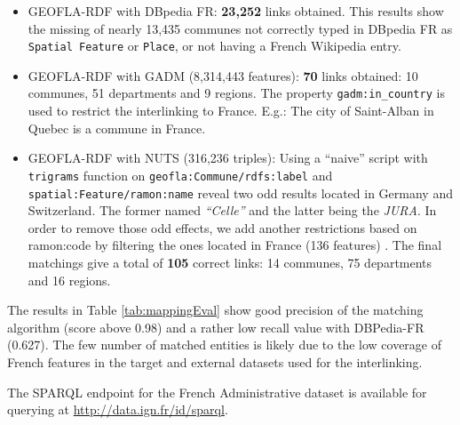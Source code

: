 \begin{itemize}
 \item GEOFLA-RDF with DBpedia FR: \textbf{23,252} links obtained. This results show the missing of nearly 13,435 communes not correctly typed in DBpedia FR as \texttt{Spatial Feature} or \texttt{Place}, or not having a French Wikipedia entry.
 \item GEOFLA-RDF with GADM (8,314,443 features): \textbf{70} links obtained: 10 communes, 51 departments and 9 regions. The property \texttt{gadm:in\_country} is used to restrict the interlinking to France. E.g.: The city of Saint-Alban in Quebec is a commune in France.
 \item GEOFLA-RDF with NUTS (316,236 triples): Using a ``naive'' script with \texttt{trigrams} function on \texttt{geofla:Commune/rdfs:label} and \texttt{spatial:Feature/ramon:name} reveal two odd results located in Germany and Switzerland. The former named \textit{``Celle''} and the latter being the \textit{JURA}. In order to remove those odd effects, we add another restrictions based on \textsf{ramon:code} by filtering the ones located in France (136 features) . The final matchings give a total of \textbf{105} correct links: 14 communes, 75 departments and 16 regions.
\end{itemize}

The results in Table \ref{tab:mappingEval} show good precision of the matching algorithm (score above 0.98) and a rather low recall value with DBPedia-FR (0.627). The few number of matched entities is likely due to the low coverage of French features in the target and external datasets used for the interlinking.


\begin{table}[!htbp]
\end{table}

The SPARQL endpoint for the French Administrative dataset is available for querying at \url{http://data.ign.fr/id/sparql}.

